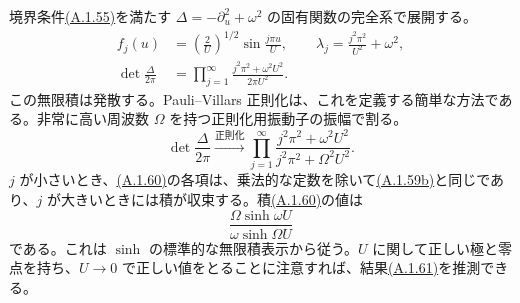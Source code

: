 境界条件\hyperref[eq:A.1.55]{(A.1.55)}を満たす $\Delta=-\partial_u^2+\omega^2$ の固有関数の完全系で展開する。
\begin{align}
f_j(u)&=\left(\frac2U\right)^{1/2}\sin\frac{j\pi u}U,
\qquad\lambda_j=\frac{j^2\pi^2}{U^2}+\omega^2,
\tag{A.1.59a}\label{eq:A.1.59a}\\
\det\frac{\Delta}{2\pi}
&=\prod_{j=1}^{\infty}\frac{j^2\pi^2+\omega^2U^2}{2\pi U^2}.
\tag{A.1.59b}\label{eq:A.1.59b}
\end{align}
この無限積は発散する。Pauli--Villars 正則化は、これを定義する簡単な方法である。非常に高い周波数 $\Omega$ を持つ正則化用振動子の振幅で割る。
\begin{equation}
\det\frac{\Delta}{2\pi}
\xrightarrow{\text{正則化}}
\prod_{j=1}^{\infty}\frac{j^2\pi^2+\omega^2U^2}{j^2\pi^2+\Omega^2U^2}.
\tag{A.1.60}\label{eq:A.1.60}
\end{equation}
$j$ が小さいとき、\hyperref[eq:A.1.60]{(A.1.60)}の各項は、乗法的な定数を除いて\hyperref[eq:A.1.59b]{(A.1.59b)}と同じであり、$j$ が大きいときには積が収束する。積\hyperref[eq:A.1.60]{(A.1.60)}の値は
\begin{equation}
\frac{\Omega\sinh\omega U}{\omega\sinh\Omega U}
\tag{A.1.61}\label{eq:A.1.61}
\end{equation}
である。これは $\sinh$ の標準的な無限積表示から従う。$U$ に関して正しい極と零点を持ち、$U\to0$ で正しい値をとることに注意すれば、結果\hyperref[eq:A.1.61]{(A.1.61)}を推測できる。

